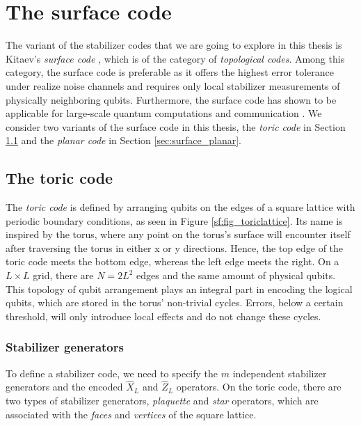 \chapter{The surface code}\label{ch:surfacecode}

The variant of the stabilizer codes that we are going to explore in this thesis is Kitaev's \emph{surface code} \cite{kitaev2003fault}, which is of the category of \emph{topological codes}. Among this category, the surface code is preferable as it offers the highest error tolerance under realize noise channels and requires only local stabilizer measurements of physically neighboring qubits. Furthermore, the surface code has shown to be applicable for large-scale quantum computations and communication \cite{fowler2010surface, fowler2012towards}. We consider two variants of the surface code in this thesis, the \emph{toric code} in Section \ref{sec:surface_toric} and the \emph{planar code} in Section \ref{sec:surface_planar}.


\section{The toric code}\label{sec:surface_toric}
The \emph{toric code} is defined by arranging qubits on the edges of a square lattice with periodic boundary conditions, as seen in Figure \ref{sf:fig_toriclattice}. Its name is inspired by the torus, where any point on the torus's surface will encounter itself after traversing the torus in either x or y directions. Hence, the top edge of the toric code meets the bottom edge, whereas the left edge meets the right. On a $L\times L$ grid, there are $N = 2L^2$ edges and the same amount of physical qubits. This topology of qubit arrangement plays an integral part in encoding the logical qubits, which are stored in the torus' non-trivial cycles. Errors, below a certain threshold, will only introduce local effects and do not change these cycles.

\subsection{Stabilizer generators}

To define a stabilizer code, we need to specify the $m$ independent stabilizer generators and the encoded $\hat{X}_L$ and $\hat{Z}_L$ operators. On the toric code, there are two types of stabilizer generators, \emph{plaquette} and \emph{star} operators, which are associated with the \emph{faces} and \emph{vertices} of the square lattice.


